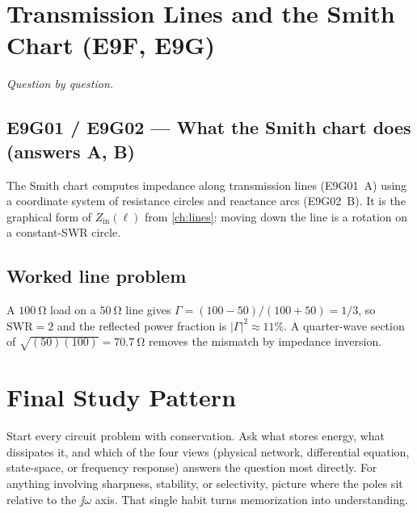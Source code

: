 \section{Transmission Lines and the Smith Chart (E9F, E9G)}
\emph{Question by question.}

\subsection*{E9G01 / E9G02 --- What the Smith chart does (answers A, B)}
The Smith chart computes impedance along transmission lines (E9G01~A) using a
coordinate system of resistance circles and reactance arcs (E9G02~B). It is the
graphical form of \(Z_{\mathrm{in}}(\ell)\) from \cref{ch:lines}: moving down the
line is a rotation on a constant-SWR circle.

\subsection*{Worked line problem}
A \(\SI{100}{\ohm}\) load on a \(\SI{50}{\ohm}\) line gives
\(\Gamma=(100-50)/(100+50)=1/3\), so \(\mathrm{SWR}=2\) and the reflected power
fraction is \(|\Gamma|^2\approx11\%\). A quarter-wave section of
\(\sqrt{(50)(100)}=\SI{70.7}{\ohm}\) removes the mismatch by impedance inversion.

\section{Final Study Pattern}
Start every circuit problem with conservation. Ask what stores energy, what
dissipates it, and which of the four views (physical network, differential
equation, state-space, or frequency response) answers the question most directly. For anything
involving sharpness, stability, or selectivity, picture where the poles sit
relative to the \(\jj\omega\) axis. That single habit turns memorization into
understanding.
